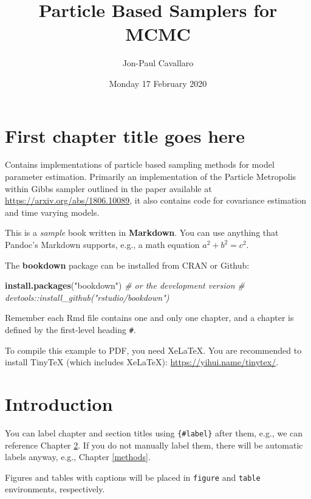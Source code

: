 \documentclass[]{book}
\title{Particle Based Samplers for MCMC}
\author{Jon-Paul Cavallaro}
\date{Monday 17 February 2020}
\newenvironment{Shaded}{\begin{snugshade}}{\end{snugshade}}
\newcommand{\KeywordTok}[1]{\textcolor[rgb]{0.13,0.29,0.53}{\textbf{#1}}}
\newcommand{\StringTok}[1]{\textcolor[rgb]{0.31,0.60,0.02}{#1}}
\newcommand{\CommentTok}[1]{\textcolor[rgb]{0.56,0.35,0.01}{\textit{#1}}}
\newcommand{\NormalTok}[1]{#1}
\begin{document}
\maketitle

{
\setcounter{tocdepth}{1}
\tableofcontents
}
\chapter{First chapter title goes
here}\label{first-chapter-title-goes-here}

Contains implementations of particle based sampling methods for model
parameter estimation. Primarily an implementation of the Particle
Metropolis within Gibbs sampler outlined in the paper available at
\url{https://arxiv.org/abs/1806.10089}, it also contains code for
covariance estimation and time varying models.

This is a \emph{sample} book written in \textbf{Markdown}. You can use
anything that Pandoc's Markdown supports, e.g., a math equation
\(a^2 + b^2 = c^2\).

The \textbf{bookdown} package can be installed from CRAN or Github:

\begin{Shaded}
\begin{Highlighting}[]
\KeywordTok{install.packages}\NormalTok{(}\StringTok{"bookdown"}\NormalTok{)}
\CommentTok{# or the development version}
\CommentTok{# devtools::install_github("rstudio/bookdown")}
\end{Highlighting}
\end{Shaded}

Remember each Rmd file contains one and only one chapter, and a chapter
is defined by the first-level heading \texttt{\#}.

To compile this example to PDF, you need XeLaTeX. You are recommended to
install TinyTeX (which includes XeLaTeX):
\url{https://yihui.name/tinytex/}.

\chapter{Introduction}\label{intro}

You can label chapter and section titles using \texttt{\{\#label\}}
after them, e.g., we can reference Chapter \ref{intro}. If you do not
manually label them, there will be automatic labels anyway, e.g.,
Chapter \ref{methods}.

Figures and tables with captions will be placed in \texttt{figure} and
\texttt{table} environments, respectively.
\end{document}

